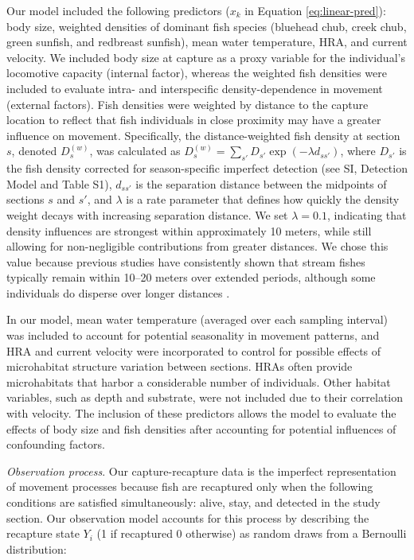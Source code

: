 \documentclass[11pt, class=article, crop=false]{standalone}
\begin{document}
Our model included the following predictors ($x_k$ in Equation \ref{eq:linear-pred}): body size, weighted densities of dominant fish species (bluehead chub, creek chub, green sunfish, and redbreast sunfish), mean water temperature, HRA, and current velocity.
We included body size at capture as a proxy variable for the individual’s locomotive capacity (internal factor), whereas the weighted fish densities were included to evaluate intra- and interspecific density-dependence in movement (external factors).
Fish densities were weighted by distance to the capture location to reflect that fish individuals in close proximity may have a greater influence on movement.
Specifically, the distance-weighted fish density at section $s$, denoted $D^{(w)}_s$, was calculated as $D^{(w)}_s = \sum_{s'} D_{s'}\exp(-\lambda d_{ss'})$, where $D_{s'}$ is the fish density corrected for season-specific imperfect detection (see SI, Detection Model and Table S1), $d_{ss'}$ is the separation distance between the midpoints of sections $s$ and $s'$, and $\lambda$ is a rate parameter that defines how quickly the density weight decays with increasing separation distance. 
We set $\lambda = 0.1$, indicating that density influences are strongest within approximately 10 meters, while still allowing for non-negligible contributions from greater distances.
We chose this value because previous studies have consistently shown that stream fishes typically remain within 10–20 meters over extended periods, although some individuals do disperse over longer distances \citep{skalskiModelingDiffusiveSpread2000, pepinoFishDispersalFragmented2012, rodriguezRestrictedMovementStream2002, teruiNonrandomDispersalSympatric2021, radingerPatternsPredictorsFish2014}.

In our model, mean water temperature (averaged over each sampling interval) was included to account for potential seasonality in movement patterns, and HRA and current velocity were incorporated to control for possible effects of microhabitat structure variation between sections. HRAs often provide microhabitats that harbor a considerable number of individuals. Other habitat variables, such as depth and substrate, were not included due to their correlation with velocity. The inclusion of these predictors allows the model to evaluate the effects of body size and fish densities after accounting for potential influences of confounding factors.

\textit{Observation process}. Our capture-recapture data is the imperfect representation of movement processes because fish are recaptured only when the following conditions are satisfied simultaneously: alive, stay, and detected in the study section. Our observation model accounts for this process by describing the recapture state $Y_i$ (1 if recaptured 0 otherwise) as random draws from a Bernoulli distribution:
\end{document}
